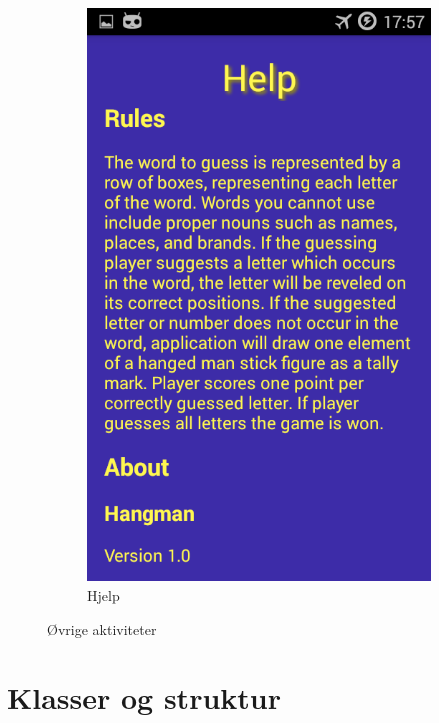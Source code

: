 \begin{figure}[ht]
\begin{subfigure}[b]{0.3\textwidth}
        \includegraphics[width=\textwidth]{./img/bruksanvisning/13.png}
        \caption{Hjelp}
        \label{fig:aktivitet_hjelp}
    \end{subfigure}
    \caption{Øvrige aktiviteter}\label{fig:aktiviteter_ovrige}
\end{figure}



\chapter{Klasser og struktur}

